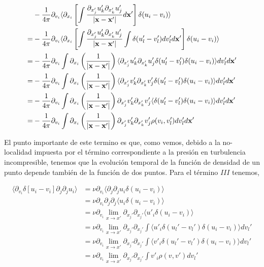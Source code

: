 \documentclass[executivepaper,12pt]{article}
\numberwithin{equation}{section}
\providecommand{\abs}[1]{\lvert#1\rvert}
\begin{document}
\begin{align*}
	&-\frac{1}{4\pi}\partial_{v_i}\langle \partial_{x_i} \left[\int \frac{\partial_{x'_j} u'_k\partial_{x'_k} u'_j}{\abs{\vb{x}-\vb{x'}}}d\vb{x'}\right]   \delta(u_i-v_i)\rangle\\
	=&-\frac{1}{4\pi}\partial_{v_i}\langle \partial_{x_i} \left[\int \frac{\partial_{x'_j} u'_k\partial_{x'_k} u'_j}{\abs{\vb{x}-\vb{x'}}} \int  \delta(u_l'-v_l') dv_l' d\vb{x'}\right]   \delta(u_i-v_i)\rangle\\
	=&-\frac{1}{4\pi}\partial_{v_i}\int \partial_{x_i}\left(\frac{1}{\abs{\vb{x}-\vb{x'}}}\right) \langle \partial_{x'_j} u'_k\partial_{x'_k} u'_j \delta(u_l'-v_l')\delta(u_i-v_i)\rangle dv_l' d\vb{x'}\\
	=&-\frac{1}{4\pi}\partial_{v_i}\int \partial_{x_i}\left(\frac{1}{\abs{\vb{x}-\vb{x'}}}\right) \langle \partial_{x'_j} v'_k\partial_{x'_k} v'_j \delta(u_l'-v_l')\delta(u_i-v_i)\rangle dv_l' d\vb{x'}\\
	=&-\frac{1}{4\pi}\partial_{v_i}\int \partial_{x_i}\left(\frac{1}{\abs{\vb{x}-\vb{x'}}}\right)  \partial_{x'_j} v'_k\partial_{x'_k} v'_j \langle \delta(u_l'-v_l')\delta(u_i-v_i)\rangle dv_l' d\vb{x'}\\
	=&-\frac{1}{4\pi}\partial_{v_i}\int \partial_{x_i}\left(\frac{1}{\abs{\vb{x}-\vb{x'}}}\right) \partial_{x'_j} v'_k\partial_{x'_k} v'_j \rho(v_i,v'_l) dv_l' d\vb{x'}\\
\end{align*} 

El punto importante de este termino es que, como vemos, debido a la no-localidad impuesta por el término correspondiente a la presión en turbulencia incompresible, tenemos que la evolución temporal de la función de densidad de un punto depende también de la función de dos puntos. Para el término $III$ tenemos, 

\begin{align*}
	\langle \partial_{v_i} \delta\left[u_i-v_i\right]\partial_j\partial_j u_i \rangle&=\nu \partial_{v_i} \langle \partial_j\partial_j u_i  \delta (u_i-v_i) \rangle\\
	&=\nu \partial_{v_i} \partial_j\partial_j \langle  u_i  \delta (u_i-v_i) \rangle\\
	&=\nu \partial_{v_i} \lim_{x\to x'}\partial_{x_j'}\partial_{x_j'} \langle  u'_i  \delta (u_i-v_i) \rangle\\
	&=\nu \partial_{v_i} \lim_{x\to x'}\partial_{x_j'}\partial_{x_j'} \int \langle  u'_i  \delta(u_l'-v_l')   \delta (u_i-v_i) \rangle dv_l'\\
	&=\nu \partial_{v_i} \lim_{x\to x'}\partial_{x_j'}\partial_{x_j'} \int \langle  v'_i  \delta(u_l'-v_l')   \delta (u_i-v_i) \rangle dv_l'\\
	&=\nu \partial_{v_i} \lim_{x\to x'}\partial_{x_j'}\partial_{x_j'} \int v'_i \rho(v,v') dv_l'\\
\end{align*}
\end{document}
